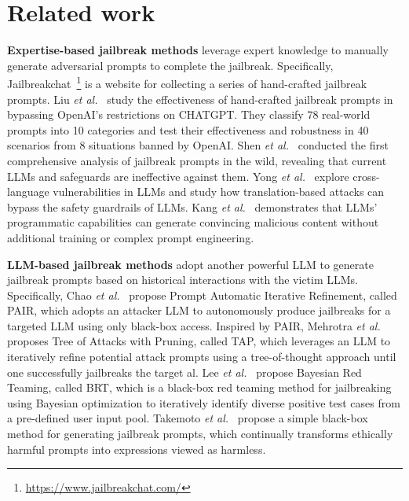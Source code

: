 \section{Related work}

\par \textbf{Expertise-based jailbreak methods} leverage expert knowledge to manually generate adversarial prompts to complete the jailbreak. Specifically, Jailbreakchat~\footnote{\url{https://www.jailbreakchat.com/}} is a website for collecting a series of hand-crafted jailbreak prompts. Liu \textit{et al.}~\cite{liu2023jailbreaking} study the effectiveness of hand-crafted jailbreak prompts in bypassing OpenAI's restrictions on CHATGPT. They classify 78 real-world prompts into 10 categories and test their effectiveness and robustness in 40 scenarios from 8 situations banned by OpenAI. Shen \textit{et al.}~\cite{shen2023anything} conducted the first comprehensive analysis of jailbreak prompts in the wild, revealing that current LLMs and safeguards are ineffective against them. Yong \textit{et al.}~\cite{yong2023low} explore cross-language vulnerabilities in LLMs and study how translation-based attacks can bypass the safety guardrails of LLMs. Kang \textit{et al.}~\cite{kang2023exploiting} demonstrates that LLMs' programmatic capabilities can generate convincing malicious content without additional training or complex prompt engineering. 

\par \textbf{LLM-based jailbreak methods} adopt another powerful LLM to generate jailbreak prompts based on historical interactions with the victim LLMs. Specifically, Chao \textit{et al.}~\cite{chao2023jailbreaking} propose Prompt Automatic Iterative Refinement, called PAIR, which adopts an attacker LLM to autonomously produce jailbreaks for a targeted LLM using only black-box access. Inspired by PAIR, Mehrotra \textit{et al.}~\cite{mehrotra2023tree} proposes Tree of Attacks with Pruning, called TAP, which leverages an LLM to iteratively refine potential attack prompts using a tree-of-thought approach until one successfully jailbreaks the target al.  Lee \textit{et al.}~\cite{lee2023query} propose Bayesian Red Teaming, called BRT, which is a black-box red teaming method for jailbreaking using Bayesian optimization to iteratively identify diverse positive test cases from a pre-defined user input pool. Takemoto \textit{et al.}~\cite{takemoto2024all} propose a simple black-box method for generating jailbreak prompts, which continually transforms ethically harmful prompts into expressions viewed as harmless. 

